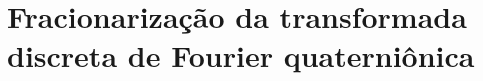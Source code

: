 %
%


\chapter[Fracionariza\c c\~ao da QDFT]{Fracionariza\c c\~ao da transformada discreta de Fourier quaterni\^onica}
\label{ch:FrQDFT}

